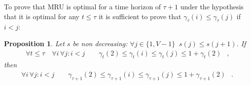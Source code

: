 \documentclass[11pt,a4paper]{article}
\DeclareMathOperator{\mf}{\enspace .}
\DeclareMathOperator{\mc}{\enspace ,}
\newtheorem{proposition}{Proposition}
\theoremstyle{definition}
\theoremstyle{remark}
\begin{document}
To prove that MRU is optimal for a time horizon of $\tau+1$ under the hypothesis
that it is optimal for any $t\leq \tau$ it is sufficient to prove that
\(\gamma_\tau(i)\leq\gamma_\tau(j)\) if \(i<j\):
\begin{proposition}\label{sec:proof-thm.-refmruthm-1}
  Let $s$ be non decreasing: $\forall j\in\{1, V-1\} \;\; s(j)\leq s(j+1)$.  If
  \begin{equation}\begin{split}
      \forall t\leq\tau \quad \forall i \, \forall j : i<j \qquad
      \gamma_t(2)\leq\gamma_t(i)\leq\gamma_t(j)\leq 1+\gamma_t(2)  \mc
    \end{split}\end{equation}
  then
  \begin{equation}\begin{split}
      \forall i\,\forall j : i<j \qquad
      \gamma_{\tau+1}(2)\leq\gamma_{\tau+1}(i)\leq\gamma_{\tau+1}(j)\leq 1+\gamma_{\tau+1}(2) \mf
    \end{split}\end{equation}
\end{proposition}
\end{document}
